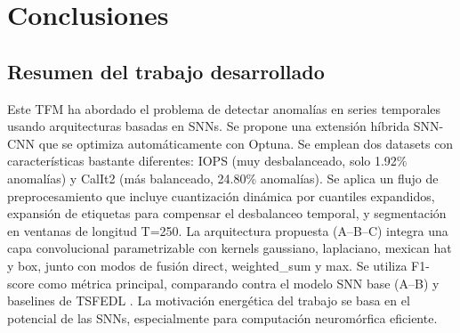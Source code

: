 \chapter{Conclusiones}
\label{chap:conclusiones}

\section{Resumen del trabajo desarrollado}
Este TFM ha abordado el problema de detectar anomalías en series temporales usando arquitecturas basadas en SNNs. Se propone una extensión híbrida SNN-CNN que se optimiza automáticamente con Optuna. Se emplean dos datasets con características bastante diferentes: IOPS (muy desbalanceado, solo 1.92\% anomalías) y CalIt2 (más balanceado, 24.80\% anomalías). Se aplica un flujo de preprocesamiento que incluye cuantización dinámica por cuantiles expandidos, expansión de etiquetas para compensar el desbalanceo temporal, y segmentación en ventanas de longitud T=250. La arquitectura propuesta (A--B--C) integra una capa convolucional parametrizable con kernels gaussiano, laplaciano, mexican hat y box, junto con modos de fusión direct, weighted\_sum y max. Se utiliza F1-score como métrica principal, comparando contra el modelo SNN base (A--B) y baselines de TSFEDL \cite{AGUILERAMARTOS2023223}. La motivación energética del trabajo se basa en el potencial de las SNNs, especialmente para computación neuromórfica eficiente.

